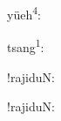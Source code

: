 \documentclass{scrartcl}
\begin{document}
yüeh\textsuperscript{4}: 

tsang\textsuperscript{1}: 


!rajiduN: 

!rajiduN: 
\end{document}

